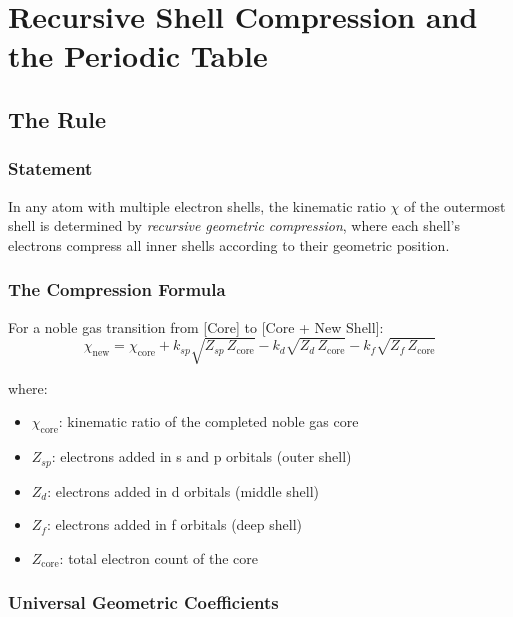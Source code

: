 \chapter{Recursive Shell Compression and the Periodic Table}



\section{The Rule}

\subsection{Statement}

In any atom with multiple electron shells, the kinematic ratio $\chi$ of the outermost shell is determined by \emph{recursive geometric compression}, where each shell's electrons compress all inner shells according to their geometric position.

\subsection{The Compression Formula}

For a noble gas transition from [Core] to [Core + New Shell]:
\begin{equation}\label{eq:compress}
  \boxed{
    \chi_{\text{new}} = \chi_{\text{core}}
      + k_{sp}\sqrt{Z_{sp}\,Z_{\text{core}}}
      - k_d\sqrt{Z_d\,Z_{\text{core}}}
      - k_f\sqrt{Z_f\,Z_{\text{core}}}
  }
\end{equation}

where:
\begin{itemize}
  \item $\chi_{\text{core}}$: kinematic ratio of the completed noble gas core
  \item $Z_{sp}$: electrons added in s and p orbitals (outer shell)
  \item $Z_d$: electrons added in d orbitals (middle shell)
  \item $Z_f$: electrons added in f orbitals (deep shell)
  \item $Z_{\text{core}}$: total electron count of the core
\end{itemize}

\subsection{Universal Geometric Coefficients}

